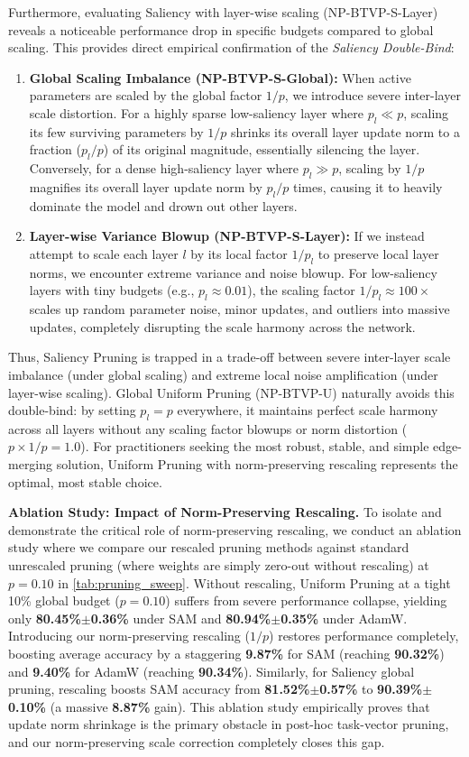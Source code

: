 Furthermore, evaluating Saliency with layer-wise scaling (NP-BTVP-S-Layer) reveals a noticeable performance drop in specific budgets compared to global scaling. This provides direct empirical confirmation of the \emph{Saliency Double-Bind}:
\begin{enumerate}
    \item \textbf{Global Scaling Imbalance (NP-BTVP-S-Global):} When active parameters are scaled by the global factor $1/p$, we introduce severe inter-layer scale distortion. For a highly sparse low-saliency layer where $p_l \ll p$, scaling its few surviving parameters by $1/p$ shrinks its overall layer update norm to a fraction ($p_l/p$) of its original magnitude, essentially silencing the layer. Conversely, for a dense high-saliency layer where $p_l \gg p$, scaling by $1/p$ magnifies its overall layer update norm by $p_l/p$ times, causing it to heavily dominate the model and drown out other layers.
    \item \textbf{Layer-wise Variance Blowup (NP-BTVP-S-Layer):} If we instead attempt to scale each layer $l$ by its local factor $1/p_l$ to preserve local layer norms, we encounter extreme variance and noise blowup. For low-saliency layers with tiny budgets (e.g., $p_l \approx 0.01$), the scaling factor $1/p_l \approx 100\times$ scales up random parameter noise, minor updates, and outliers into massive updates, completely disrupting the scale harmony across the network.
\end{enumerate}
Thus, Saliency Pruning is trapped in a trade-off between severe inter-layer scale imbalance (under global scaling) and extreme local noise amplification (under layer-wise scaling). Global Uniform Pruning (NP-BTVP-U) naturally avoids this double-bind: by setting $p_l = p$ everywhere, it maintains perfect scale harmony across all layers without any scaling factor blowups or norm distortion ($p \times 1/p = 1.0$). For practitioners seeking the most robust, stable, and simple edge-merging solution, Uniform Pruning with norm-preserving rescaling represents the optimal, most stable choice.

\textbf{Ablation Study: Impact of Norm-Preserving Rescaling.} To isolate and demonstrate the critical role of norm-preserving rescaling, we conduct an ablation study where we compare our rescaled pruning methods against standard unrescaled pruning (where weights are simply zero-out without rescaling) at $p=0.10$ in \cref{tab:pruning_sweep}. Without rescaling, Uniform Pruning at a tight 10\% global budget ($p=0.10$) suffers from severe performance collapse, yielding only \textbf{80.45\%$\pm$0.36\%} under SAM and \textbf{80.94\%$\pm$0.35\%} under AdamW. Introducing our norm-preserving rescaling ($1/p$) restores performance completely, boosting average accuracy by a staggering \textbf{9.87\%} for SAM (reaching \textbf{90.32\%}) and \textbf{9.40\%} for AdamW (reaching \textbf{90.34\%}). Similarly, for Saliency global pruning, rescaling boosts SAM accuracy from \textbf{81.52\%$\pm$0.57\%} to \textbf{90.39\%$\pm$0.10\%} (a massive \textbf{8.87\%} gain). This ablation study empirically proves that update norm shrinkage is the primary obstacle in post-hoc task-vector pruning, and our norm-preserving scale correction completely closes this gap.

